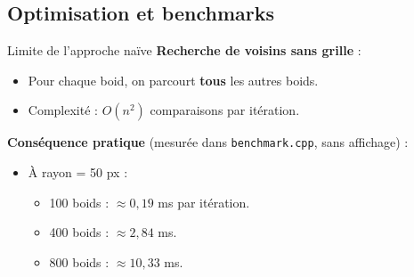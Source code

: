 \documentclass[aspectratio=169]{beamer}
\begin{document}
\subsection{Optimisation et benchmarks}

\begin{frame}{Limite de l'approche naïve}
  \textbf{Recherche de voisins sans grille} :
  \begin{itemize}
    \item Pour chaque boid, on parcourt \textbf{tous} les autres boids.
    \item Complexité : \(O(n^2)\) comparaisons par itération.
  \end{itemize}

  \vspace{0.4cm}
  \textbf{Conséquence pratique} (mesurée dans \texttt{benchmark.cpp}, sans affichage) :
  \begin{itemize}
    \item À rayon = 50 px :
    \begin{itemize}
      \item 100 boids : \(\approx 0{,}19\) ms par itération.
      \item 400 boids : \(\approx 2{,}84\) ms.
      \item 800 boids : \(\approx 10{,}33\) ms.
    \end{itemize}
  \end{itemize}
\end{frame}
\end{document}
